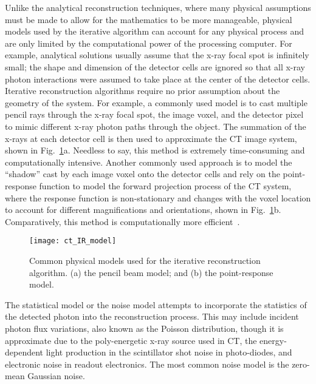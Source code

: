 
Unlike the analytical reconstruction techniques, where many physical assumptions must be made to allow for the mathematics to be more manageable, physical models used by the iterative algorithm can account for any physical process and are only limited by the computational power of the processing computer.  For example, analytical solutions usually assume that the x-ray focal spot is infinitely small; the shape and dimension of the detector cells are ignored so that all x-ray photon interactions were assumed to take place at the center of the detector cells.  Iterative reconstruction algorithms require no prior assumption about the geometry of the system.  For example, a commonly used model is to cast multiple pencil rays through the x-ray focal spot, the image voxel, and the detector pixel to mimic different x-ray photon paths through the object.  The summation of the x-rays at each detector cell is then used to approximate the CT image system, shown in Fig.~\ref{fig:physical_modeling}a. Needless to say, this method is extremely time-consuming and computationally intensive.  Another commonly used approach is to model the ``shadow'' cast by each image voxel onto the detector cells and rely on the point-response function to model the forward projection process of the CT system, where the response function is non-stationary and changes with the voxel location to account for different magnifications and orientations, shown in Fig.~\ref{fig:physical_modeling}b.  Comparatively, this method is computationally more efficient~\citep{Hsieh2013}.
%
\begin{figure}
\texttt{[image: ct\_IR\_model]}
\caption{Common physical models used for the iterative reconstruction algorithm. (a) the pencil beam model; and (b) the point-response model.}
\label{fig:physical_modeling}
\end{figure}

The statistical model or the noise model attempts to incorporate the statistics of the detected photon into the reconstruction process.  This may include incident photon flux variations, also known as the Poisson distribution, though it is approximate due to the poly-energetic x-ray source used in CT, the energy-dependent light production in the scintillator shot noise in photo-diodes, and electronic noise in readout electronics. The most common noise model is the zero-mean Gaussian noise.

